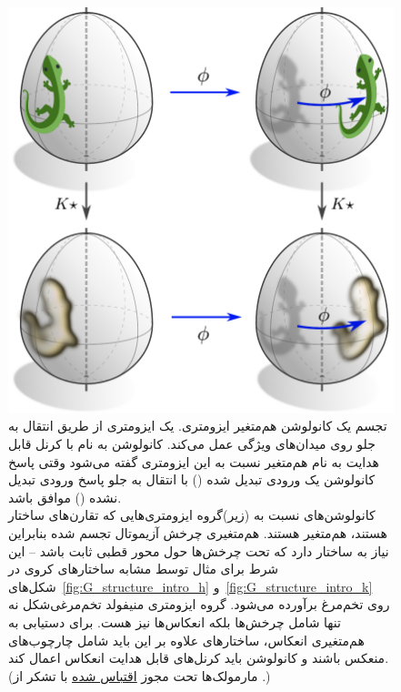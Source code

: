 \begin{figure}
	\centering
	\hspace*{2ex}
	\includegraphics[width=.5\textwidth]{figures/lizard_conv_egg_intro.pdf}
	\captionsetup{width=.9\textwidth}
	\caption[]{\small
		تجسم یک کانولوشن \lr{$\GM$} هم‌متغیر ایزومتری.
		یک ایزومتری \lr{$\phi$} از طریق انتقال به جلو روی میدان‌های ویژگی عمل می‌کند.
		کانولوشن \lr{$\GM$} به نام  با کرنل قابل هدایت  به نام  هم‌متغیر نسبت به این ایزومتری گفته می‌شود وقتی پاسخ کانولوشن یک ورودی تبدیل شده (\lr{$\rightarrow,\downarrow$}) با انتقال به جلو پاسخ ورودی تبدیل نشده (\lr{$\downarrow,\rightarrow$}) موافق باشد.
		\\[1ex]
		کانولوشن‌های \lr{$\GM$} نسبت به (زیر)گروه  ایزومتری‌هایی که تقارن‌های ساختار  هستند، هم‌متغیر هستند.
		هم‌متغیری چرخش آزیموتال تجسم شده بنابراین نیاز به ساختار  دارد که تحت چرخش‌ها حول محور قطبی ثابت باشد -- این شرط برای مثال توسط مشابه ساختارهای  کروی در شکل‌های~\ref{fig:G_structure_intro_h} و~\ref{fig:G_structure_intro_k} روی تخم‌مرغ برآورده می‌شود.
		گروه ایزومتری منیفولد تخم‌مرغی‌شکل نه تنها شامل چرخش‌ها بلکه انعکاس‌ها نیز هست.
		برای دستیابی به هم‌متغیری انعکاس، ساختارهای  علاوه بر این باید شامل چارچوب‌های منعکس باشند و کانولوشن \lr{$\GM$} باید کرنل‌های قابل هدایت انعکاس اعمال کند.
		{\\
			\color{gray}
			\scriptsize
			(مارمولک‌ها تحت مجوز 
			\href{https://github.com/twitter/twemoji/blob/gh-pages/LICENSE-GRAPHICS}{\underline{اقتباس شده}}
			با تشکر از .)
		}
		\\[-16pt]
	}
	\label{fig:lizard_conv_egg_intro}
\end{figure}


